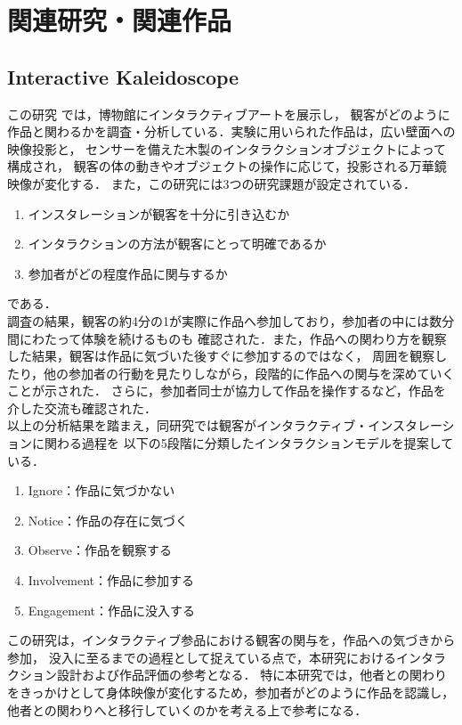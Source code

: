 
\chapter{関連研究・関連作品}
\label{chp:second}

\section{Interactive Kaleidoscope}
\label{sec:eqn}

この研究 \cite{Bongers2011InteractiveKA}では，博物館にインタラクティブアートを展示し，
観客がどのように作品と関わるかを調査・分析している．実験に用いられた作品は，広い壁面への映像投影と，
センサーを備えた木製のインタラクションオブジェクトによって構成され，
観客の体の動きやオブジェクトの操作に応じて，投影される万華鏡映像が変化する．
また，この研究には3つの研究課題が設定されている．
\begin{enumerate}
    \item インスタレーションが観客を十分に引き込むか
    \item インタラクションの方法が観客にとって明確であるか
    \item 参加者がどの程度作品に関与するか
\end{enumerate}
である．\\
調査の結果，観客の約4分の1が実際に作品へ参加しており，参加者の中には数分間にわたって体験を続けるものも
確認された．また，作品への関わり方を観察した結果，観客は作品に気づいた後すぐに参加するのではなく，
周囲を観察したり，他の参加者の行動を見たりしながら，段階的に作品への関与を深めていくことが示された．
さらに，参加者同士が協力して作品を操作するなど，作品を介した交流も確認された．\\
以上の分析結果を踏まえ，同研究では観客がインタラクティブ・インスタレーションに関わる過程を
以下の5段階に分類したインタラクションモデルを提案している．
\begin{enumerate}
    \item Ignore：作品に気づかない
    \item Notice：作品の存在に気づく
    \item Observe：作品を観察する
    \item Involvement：作品に参加する
    \item Engagement：作品に没入する
\end{enumerate}
この研究は，インタラクティブ参品における観客の関与を，作品への気づきから参加，
没入に至るまでの過程として捉えている点で，本研究におけるインタラクション設計および作品評価の参考となる．
特に本研究では，他者との関わりをきっかけとして身体映像が変化するため，参加者がどのように作品を認識し，
他者との関わりへと移行していくのかを考える上で参考になる．

